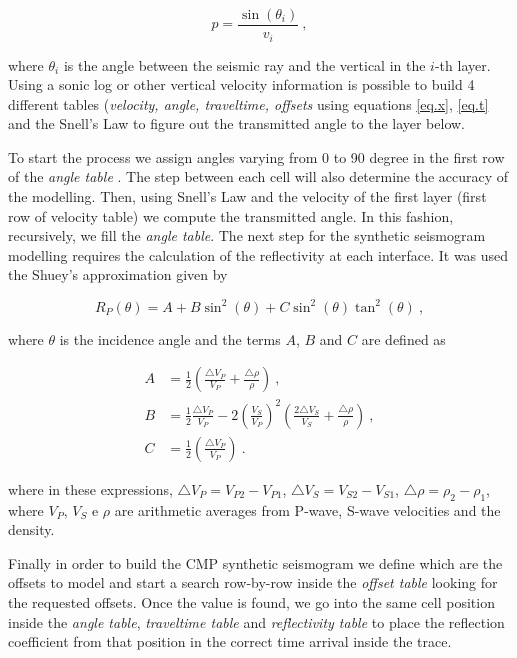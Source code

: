 \documentclass{vie16}
\begin{document}
\begin{equation}
p = \frac{\sin(\theta_{i})}{v_{i}}\ ,\label{eq.p}
\end{equation}

where $\theta_i$ is the angle between the seismic ray and the vertical in the 
$i$-th layer. Using a sonic log or other vertical velocity information is 
possible to build 4 different tables (\textit{velocity, angle, traveltime, 
offsets} using equations \ref{eq.x}, \ref{eq.t} and the Snell's Law to figure out 
the transmitted angle to the layer below.

To start the process we assign angles varying from 0 to 90 degree in the first 
row of the \textit{angle table} . The step between each cell will also 
determine the accuracy of the modelling. Then, using Snell's Law and the 
velocity of the first layer (first row of velocity table) we compute the 
transmitted angle. In this fashion, recursively, we fill the \textit{angle table}. 
The next step for the synthetic seismogram modelling requires the 
calculation of the reflectivity at each interface. It was used the Shuey's 
approximation \cite{Shuey1985} given by

\begin{equation}
R_{P} (\theta) = A + B\sin^{2}(\theta) + C\sin^{2}(\theta)\tan^{2}(\theta)
\ , \label{eq.shuey}
\end{equation}

where $\theta$ is the incidence angle and the terms $A$, $B$ and $C$ are 
defined as

\begin{equation}
\begin{split}
A & = \frac{1}{2} \left(\frac{\triangle V_{P}}{V_{P}}     +
\frac{\triangle \rho}{\rho}     \right)\ , \\
B & = \frac{1}{2} \frac{\triangle V_{P}}{V_{P}}  - 2\left(\frac{
V_{S}}{V_{P}}\right)^{2}  \left(\frac{2\triangle V_{S}}{V_{S}} +
\frac{\triangle \rho}{\rho}\right)   \ , \\
C & = \frac{1}{2} \left(\frac{\triangle V_{P}}{V_{P}} \right) \ .
\end{split}
\end{equation}

where in these expressions, $\triangle V_{P} = V_{P2} - V_{P1}$, $\triangle 
V_{S} = V_{S2} - V_{S1}$, $\triangle \rho = \rho_{2} - \rho_{1}$, where 
$V_{P}$, $V_{S}$ e $\rho$ are arithmetic averages from P-wave, S-wave 
velocities and the density.

Finally in order to build the CMP synthetic seismogram we define which are 
the offsets to model and start a search row-by-row inside the \textit{offset 
table} looking for the requested offsets. Once the value is found, we go into 
the same cell position inside the \textit{angle table}, \textit{traveltime table} 
and \textit{reflectivity table} to place the reflection coefficient from that 
position in the correct time arrival inside the trace.
\end{document}
